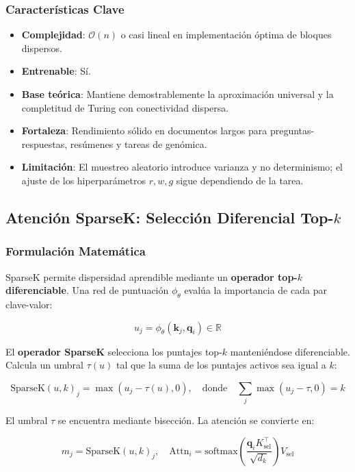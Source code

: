 \subsubsection{Características Clave}

\begin{itemize}[leftmargin=*]
    \item \textbf{Complejidad}: $\mathcal{O}(n)$ o casi lineal en implementación óptima de bloques dispersos.
    \item \textbf{Entrenable}: Sí.
    \item \textbf{Base teórica}: Mantiene demostrablemente la aproximación universal y la completitud de Turing con conectividad dispersa.
    \item \textbf{Fortaleza}: Rendimiento sólido en documentos largos para preguntas-respuestas, resúmenes y tareas de genómica.
    \item \textbf{Limitación}: El muestreo aleatorio introduce varianza y no determinismo; el ajuste de los hiperparámetros $r, w, g$ sigue dependiendo de la tarea.
\end{itemize}

\subsection{Atención SparseK: Selección Diferencial Top-$k$}

\subsubsection{Formulación Matemática}

SparseK \citep{lou_sparsek_2024} permite dispersidad aprendible mediante un \textbf{operador top-$k$ diferenciable}. Una red de puntuación $\phi_\theta$ evalúa la importancia de cada par clave-valor:

\[
u_j = \phi_\theta(\mathbf{k}_j, \mathbf{q}_i) \in \mathbb{R}
\]

El \textbf{operador SparseK} selecciona los puntajes top-$k$ manteniéndose diferenciable. Calcula un umbral $\tau(u)$ tal que la suma de los puntajes activos sea igual a $k$:

\[
\text{SparseK}(u, k)_j = \max(u_j - \tau(u), 0), \quad \text{donde} \quad \sum_j \max(u_j - \tau, 0) = k
\]

El umbral $\tau$ se encuentra mediante bisección. La atención se convierte en:

\[
m_j = \text{SparseK}(u, k)_j, \quad \text{Attn}_i = \text{softmax}\left(\frac{\mathbf{q}_i K_{\text{sel}}^\top}{\sqrt{d_k}}\right) V_{\text{sel}}
\]

